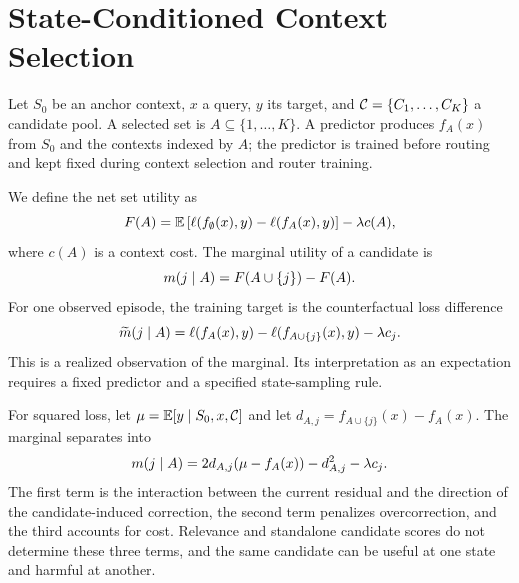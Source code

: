 \section{State-Conditioned Context Selection}

Let $S_0$ be an anchor context, $x$ a query, $y$ its target, and
$\mathcal{C}=\{C_1,\ldots,C_K\}$ a candidate pool. A selected set is
$A\subseteq\{1,\ldots,K\}$. A predictor produces $f_A(x)$ from $S_0$ and the
contexts indexed by $A$; the predictor is trained before routing and kept
fixed during context selection and router training.

We define the net set utility as
\begin{equation}
 F(A)=\mathbb{E}\left[\ell(f_{\emptyset}(x),y)-\ell(f_A(x),y)\right]
       -\lambda c(A),
\end{equation}
where $c(A)$ is a context cost. The marginal utility of a candidate is
\begin{equation}
 m(j\mid A)=F(A\cup\{j\})-F(A).
 \label{eq:marginal}
\end{equation}
For one observed episode, the training target is the counterfactual loss
difference
\begin{equation}
 \widetilde{m}(j\mid A)=\ell(f_A(x),y)-\ell(f_{A\cup\{j\}}(x),y)-\lambda c_j.
 \label{eq:target}
\end{equation}
This is a realized observation of the marginal. Its interpretation as an
expectation requires a fixed predictor and a specified state-sampling rule.

For squared loss, let $\mu=\mathbb{E}[y\mid S_0,x,\mathcal{C}]$ and let
$d_{A,j}=f_{A\cup\{j\}}(x)-f_A(x)$. The marginal separates into
\begin{equation}
 m(j\mid A)=2d_{A,j}(\mu-f_A(x))-d_{A,j}^2-\lambda c_j.
 \label{eq:squared-marginal}
\end{equation}
The first term is the interaction between the current residual and the
direction of the candidate-induced correction, the second term penalizes
overcorrection, and the third accounts for cost. Relevance and standalone
candidate scores do not determine these three terms, and the same candidate
can be useful at one state and harmful at another.

